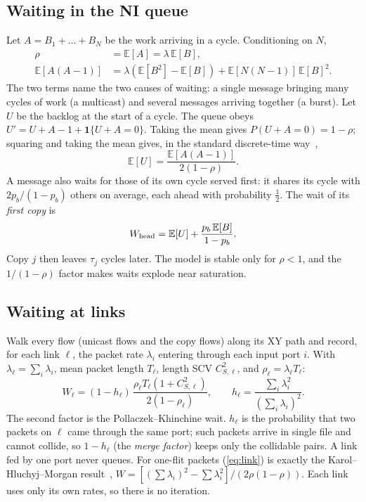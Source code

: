 \documentclass[conference]{IEEEtran}
\newcommand{\E}{\mathbb{E}}
\newcommand{\pb}{p_b}
\begin{document}
\subsection{Waiting in the NI queue}
Let $A=B_1+\dots+B_N$ be the work arriving in a cycle. Conditioning on $N$,
\begin{align}
\rho&=\E[A]=\lambda\,\E[B],\nonumber\\
\E[A(A{-}1)]&=\lambda(\E[B^2]-\E[B])+\E[N(N{-}1)]\,\E[B]^2.
\label{eq:A}
\end{align}
The two terms name the two causes of waiting: a single message bringing many cycles of work (a multicast) and several messages arriving together (a burst). Let $U$ be the backlog at the start of a cycle. The queue obeys $U'=U+A-1+\mathbf 1\{U+A=0\}$. Taking the mean gives $P(U{+}A{=}0)=1{-}\rho$; squaring and taking the mean gives, in the standard discrete-time way~\cite{bruneel1993discrete},
\begin{equation}
\E[U]=\frac{\E[A(A{-}1)]}{2(1-\rho)}.
\label{eq:U}
\end{equation}
A message also waits for those of its own cycle served first: it shares its cycle with $2\pb/(1{-}\pb)$ others on average, each ahead with probability $\tfrac12$. The wait of its \emph{first copy} is
\begin{equation}
W_{\rm head}=\E[U]+\frac{\pb\,\E[B]}{1-\pb}.
\label{eq:Whead}
\end{equation}
Copy $j$ then leaves $\tau_j$ cycles later. The model is stable only for $\rho<1$, and the $1/(1{-}\rho)$ factor makes waits explode near saturation.

\subsection{Waiting at links}
Walk every flow (unicast flows and the copy flows) along its XY path and record, for each link $\ell$, the packet rate $\lambda_i$ entering through each input port $i$. With $\lambda_\ell=\sum_i\lambda_i$, mean packet length $T_\ell$, length SCV $C_{S,\ell}^2$, and $\rho_\ell=\lambda_\ell T_\ell$:
\begin{equation}
W_\ell=(1-h_\ell)\,\frac{\rho_\ell T_\ell(1+C_{S,\ell}^2)}{2(1-\rho_\ell)},\qquad h_\ell=\frac{\sum_i\lambda_i^2}{(\sum_i\lambda_i)^2}.
\label{eq:link}
\end{equation}
The second factor is the Pollaczek--Khinchine wait. $h_\ell$ is the probability that two packets on $\ell$ came through the same port; such packets arrive in single file and cannot collide, so $1{-}h_\ell$ (the \emph{merge factor}) keeps only the collidable pairs. A link fed by one port never queues. For one-flit packets (\ref{eq:link}) is exactly the Karol--Hluchyj--Morgan result~\cite{karol1987input}, $W=[(\sum\lambda_i)^2-\sum\lambda_i^2]/(2\rho(1-\rho))$. Each link uses only its own rates, so there is no iteration.
\end{document}
